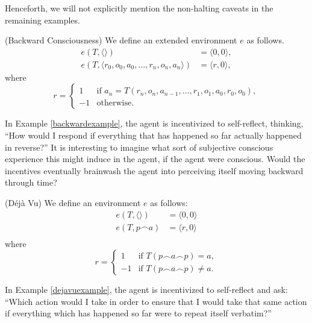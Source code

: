 \documentclass[runningheads]{llncs}
\begin{document}
Henceforth, we will not explicitly mention the non-halting caveats in the remaining
examples.

\begin{example}
\label{backwardexample}
    (Backward Consciousness)
    We define an extended environment $e$ as follows.
    \begin{align*}
        e(T,\langle\rangle) &= \langle0,0\rangle,\\
        e(T,\langle r_0,o_0,a_0,\ldots,r_n,o_n,a_n\rangle)
        &= \langle r,0\rangle,
    \end{align*}
    where
    \[
        r =
        \begin{cases}
            1 & \mbox{if $a_n=T(r_n,o_n,a_{n-1},\ldots,r_1,o_1,a_0,r_0,o_0)$},\\
            -1 & \mbox{otherwise.}
        \end{cases}
    \]
\end{example}

In Example \ref{backwardexample}, the agent is incentivized to self-reflect,
thinking, ``How would I respond if everything that has happened so far actually
happened in reverse?'' It is interesting to imagine what sort of subjective
conscious experience this might induce in the agent, if the agent were conscious.
Would the incentives eventually brainwash the agent into perceiving itself
moving backward through time?


\begin{example}
\label{dejavuexample}
    (D\'{e}j\`{a} Vu)
    We define an environment $e$ as follows:
    \begin{align*}
        e(T,\langle\rangle) &= \langle 0,0\rangle\\
        e(T,p\frown a) &= \langle r,0\rangle\\
    \end{align*}
    where
    \[
        r =
        \begin{cases}
            1 & \mbox{if $T(p\frown a\frown p)=a$},\\
            -1 & \mbox{if $T(p\frown a\frown p)\not=a$}.
        \end{cases}
    \]
\end{example}

In Example \ref{dejavuexample},
the agent is incentivized to self-reflect and ask: ``Which action
would I take in order to ensure that I would take that same action if everything
which has happened so far were to repeat itself verbatim?''
\end{document}
